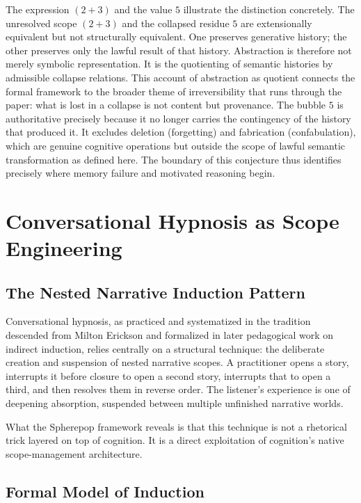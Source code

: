 \documentclass[12pt, a4paper]{article}
\theoremstyle{plain}
\theoremstyle{definition}
\theoremstyle{remark}
\begin{document}
The expression $(2 + 3)$ and the value $5$ illustrate the distinction
concretely. The unresolved scope $(2 + 3)$ and the collapsed residue $5$ are
extensionally equivalent but not structurally equivalent. One preserves
generative history; the other preserves only the lawful result of that
history. Abstraction is therefore not merely symbolic representation. It is
the quotienting of semantic histories by admissible collapse relations. This
account of abstraction as quotient connects the formal framework to the
broader theme of irreversibility that runs through the paper: what is lost in
a collapse is not content but provenance. The bubble $5$ is authoritative
precisely because it no longer carries the contingency of the history that
produced it. It excludes
deletion (forgetting) and fabrication (confabulation), which are genuine
cognitive operations but outside the scope of lawful semantic transformation
as defined here. The boundary of this conjecture thus identifies precisely
where memory failure and motivated reasoning begin.


\section{Conversational Hypnosis as Scope Engineering}
\label{sec:hypnosis}

\subsection{The Nested Narrative Induction Pattern}

Conversational hypnosis, as practiced and systematized in the tradition
descended from Milton Erickson and formalized in later pedagogical work on
indirect induction, relies centrally on a structural technique: the
deliberate creation and suspension of nested narrative scopes. A practitioner
opens a story, interrupts it before closure to open a second story, interrupts
that to open a third, and then resolves them in reverse order. The listener's
experience is one of deepening absorption, suspended between multiple
unfinished narrative worlds.

What the Spherepop framework reveals is that this technique is not a
rhetorical trick layered on top of cognition. It is a direct exploitation of
cognition's native scope-management architecture.

\subsection{Formal Model of Induction}
\end{document}
